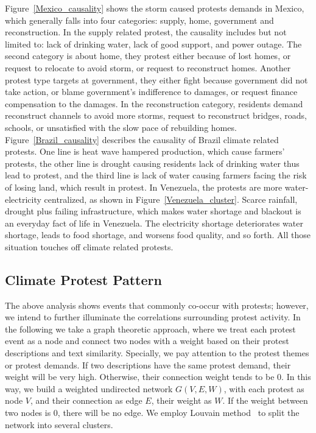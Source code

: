 Figure~\ref{Mexico_causality} shows the storm caused protests demands in Mexico, which generally falls into four categories: supply, home, government and reconstruction. In the supply related protest, the causality includes but not limited to: lack of drinking water, lack of good support, and power outage. The second category is about home, they protest either because of lost homes, or request to relocate to avoid storm, or request to reconstruct homes. Another protest type targets at government, they either fight because government did not take action, or blame government's indifference to damages, or request finance compensation to the damages. In the reconstruction category, residents demand reconstruct channels to avoid more storms, request to reconstruct bridges, roads, schools, or unsatisfied with the slow pace of rebuilding homes. Figure~\ref{Brazil_causality} describes the causality of Brazil climate related protests. One line is heat wave hampered production, which cause farmers' protests, the other line is drought causing residents lack of drinking water thus lead to protest, and the third line is lack of water causing farmers facing the risk of losing land, which result in protest. In Venezuela, the protests are more water-electricity centralized, as shown in Figure~\ref{Venezuela_cluster}. Scarce rainfall, drought plus failing infrastructure, which makes water shortage and blackout is an everyday fact of life in Venezuela. The electricity shortage deteriorates water shortage, leads to food shortage, and worsens food quality, and so forth. All those situation touches off climate related protests.


\subsection{Climate Protest Pattern}
The above analysis shows events that commonly co-occur with protests; however, we intend to further illuminate the correlations surrounding protest activity.
In the following we take a graph theoretic approach, where we treat each protest event as a node and connect two nodes with a weight based on their protest descriptions and text similarity. Specially, we pay attention to the protest themes or protest demands. If two descriptions have the same protest demand, their weight will be very high. Otherwise, their connection weight tends to be 0.
In this way, we build a weighted undirected network $G(V, E, W)$, with each protest as node $V$, and their connection as edge $E$, their weight as $W$. If the weight between two nodes is 0, there will be no edge. We employ Louvain method~\cite{blondel2008fast} to split the network into several clusters.


